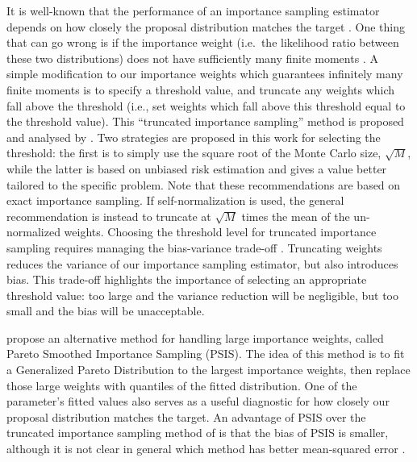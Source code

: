 \documentclass[ss]{imsart}
\theoremstyle{plain}
\theoremstyle{definition}
\theoremstyle{remark}
\begin{document}
It is well-known that the performance of an importance sampling estimator depends on how closely the proposal distribution matches the target \citep{Rob04}. One thing that can go wrong is if the importance weight (i.e.\ the likelihood ratio between these two distributions) does not have sufficiently many finite moments \citep{Aga17}. A simple modification to our importance weights which guarantees infinitely many finite moments is to specify a threshold value, and truncate any weights which fall above the threshold (i.e., set weights which fall above this threshold equal to the threshold value). This ``truncated importance sampling'' method is proposed and analysed by \citet{Ion08}. Two strategies are proposed in this work for selecting the threshold: the first is to simply use the square root of the Monte Carlo size, $\sqrt{M}$, while the latter is based on unbiased risk estimation and gives a value better tailored to the specific problem. Note that these recommendations are based on exact importance sampling. If self-normalization is used, the general recommendation is instead to truncate at $\sqrt{M}$ times the mean of the un-normalized weights. Choosing the threshold level for truncated importance sampling requires managing the bias-variance trade-off \citep{Has09}. Truncating weights reduces the variance of our importance sampling estimator, but also introduces bias. This trade-off highlights the importance of selecting an appropriate threshold value: too large and the variance reduction will be negligible, but too small and the bias will be unacceptable.

\citet{Veh22} propose an alternative method for handling large importance weights, called Pareto Smoothed Importance Sampling (PSIS). The idea of this method is to fit a Generalized Pareto Distribution to the largest importance weights, then replace those large weights with quantiles of the fitted distribution. One of the parameter's fitted values also serves as a useful diagnostic for how closely our proposal distribution matches the target. An advantage of PSIS over the truncated importance sampling method of \citet{Ion08} is that the bias of PSIS is smaller, although it is not clear in general which method has better mean-squared error \citep[see][for extensive numerical comparisons]{Veh22}.  
\end{document}
